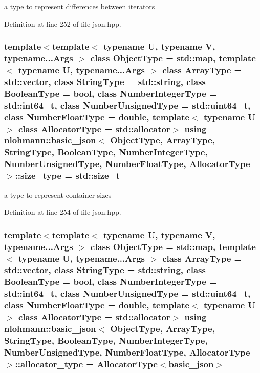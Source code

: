 a type to represent differences between iterators 



Definition at line 252 of file json.\+hpp.

\hypertarget{classnlohmann_1_1basic__json_a1579a8f72a230358d6cd1a6e8a62859b}{}
\subsubsection[{size\+\_\+type}]{\setlength{\rightskip}{0pt plus 5cm}template$<$template$<$ typename U, typename V, typename...\+Args $>$ class Object\+Type = std\+::map, template$<$ typename U, typename...\+Args $>$ class Array\+Type = std\+::vector, class String\+Type  = std\+::string, class Boolean\+Type  = bool, class Number\+Integer\+Type  = std\+::int64\+\_\+t, class Number\+Unsigned\+Type  = std\+::uint64\+\_\+t, class Number\+Float\+Type  = double, template$<$ typename U $>$ class Allocator\+Type = std\+::allocator$>$ using {\bf nlohmann\+::basic\+\_\+json}$<$ Object\+Type, Array\+Type, String\+Type, Boolean\+Type, Number\+Integer\+Type, Number\+Unsigned\+Type, Number\+Float\+Type, Allocator\+Type $>$\+::{\bf size\+\_\+type} =  std\+::size\+\_\+t}\label{classnlohmann_1_1basic__json_a1579a8f72a230358d6cd1a6e8a62859b}


a type to represent container sizes 



Definition at line 254 of file json.\+hpp.

\hypertarget{classnlohmann_1_1basic__json_aa44ce84b9ac506b905b8fb56c9a0989d}{}
\subsubsection[{allocator\+\_\+type}]{\setlength{\rightskip}{0pt plus 5cm}template$<$template$<$ typename U, typename V, typename...\+Args $>$ class Object\+Type = std\+::map, template$<$ typename U, typename...\+Args $>$ class Array\+Type = std\+::vector, class String\+Type  = std\+::string, class Boolean\+Type  = bool, class Number\+Integer\+Type  = std\+::int64\+\_\+t, class Number\+Unsigned\+Type  = std\+::uint64\+\_\+t, class Number\+Float\+Type  = double, template$<$ typename U $>$ class Allocator\+Type = std\+::allocator$>$ using {\bf nlohmann\+::basic\+\_\+json}$<$ Object\+Type, Array\+Type, String\+Type, Boolean\+Type, Number\+Integer\+Type, Number\+Unsigned\+Type, Number\+Float\+Type, Allocator\+Type $>$\+::{\bf allocator\+\_\+type} =  Allocator\+Type$<${\bf basic\+\_\+json}$>$}\label{classnlohmann_1_1basic__json_aa44ce84b9ac506b905b8fb56c9a0989d}


